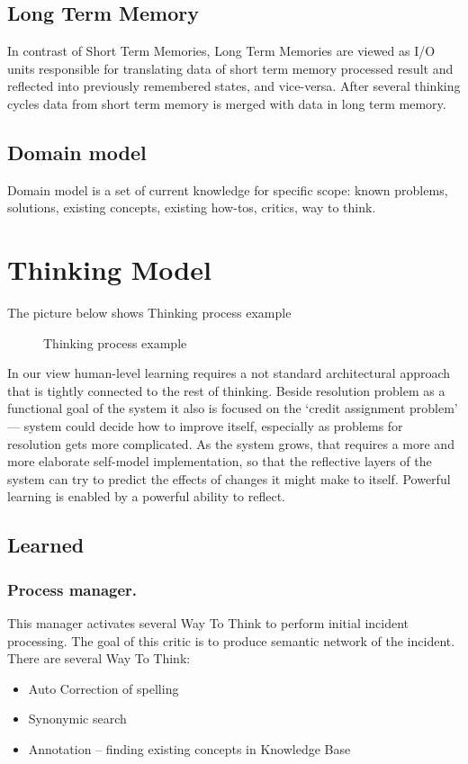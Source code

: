 \documentclass[runningheads,a4paper]{llncs}
\begin{document}
\subsection{Long Term Memory}
In contrast of Short Term Memories, Long Term Memories are viewed as I/O units responsible for translating data of short term memory processed result and reflected into previously remembered states, and vice-versa. After several thinking cycles data from short term memory is merged with data in long term memory.

\subsection{Domain model}
Domain model is a set of current knowledge for specific scope: known problems, solutions, existing concepts, existing how-tos, critics, way to think.\\

\section{Thinking Model}
The picture below shows Thinking process example

\begin{figure}


\caption{Thinking process example}
\end{figure}
In our view human-level learning requires a not standard architectural approach that is tightly connected to the rest of thinking. Beside resolution problem as a functional goal of the system it also is focused on the ‘credit assignment problem’ — system could decide how to improve itself, especially as problems for resolution gets more complicated.  As the system grows, that requires a more and more elaborate self-model implementation, so that the reflective layers of the system can try to predict the effects of changes it might make to itself. Powerful learning is enabled by a powerful ability to reflect.


\subsection{Learned}

\subsubsection{Process manager.} This manager activates several Way To Think to perform initial incident processing. The goal of this critic is to produce semantic network of the incident. There are several Way To Think:
\begin{itemize}
 \item Auto Correction of spelling
 \item Synonymic search
 \item Annotation – finding existing concepts in Knowledge Base
\end{itemize}
\end{document}
